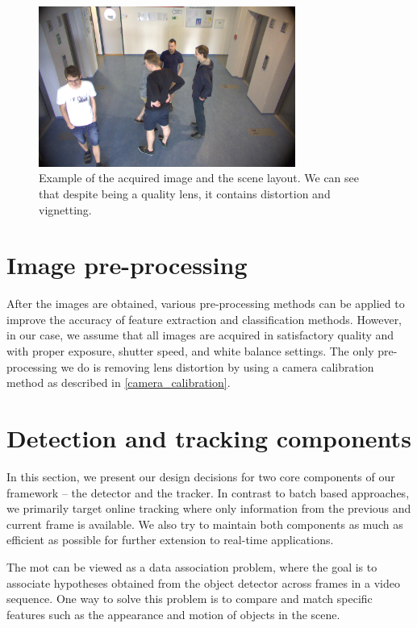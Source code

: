     \begin{figure}[ht]
        \centering
        \includegraphics[width=0.75\textwidth]{resources/scene_example.png}
        \caption{Example of the acquired image and the scene layout. We can see that despite being a quality lens, it contains distortion and vignetting.}
        \label{fig:scene_example}
    \end{figure}
        

\section{Image pre-processing}
    After the images are obtained, various pre-processing methods can be applied to improve the accuracy of feature extraction and classification methods. However, in our case, we assume that all images are acquired in satisfactory quality and with proper exposure, shutter speed, and white balance settings. The only pre-processing we do is removing lens distortion by using a camera calibration method as described in \ref{camera_calibration}.

\section{Detection and tracking components}\label{detection_and_tracking_components}
    In this section, we present our design decisions for two core components of our framework -- the detector and the tracker. In contrast to batch based approaches, we primarily target online tracking where only information from the previous and current frame is available. We also try to maintain both components as much as efficient as possible for further extension to real-time applications.

    The \gls{mot} can be viewed as a data association problem, where the goal is to associate hypotheses obtained from the object detector across frames in a video sequence. One way to solve this problem is to compare and match specific features such as the appearance and motion of objects in the scene. 
    
